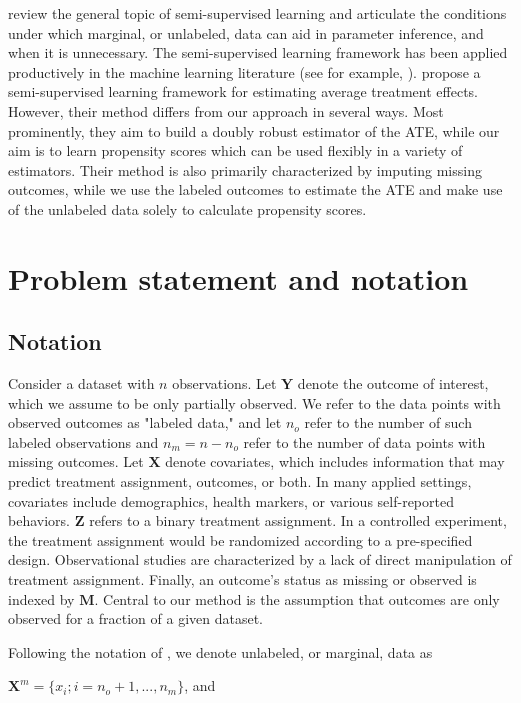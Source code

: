 \documentclass[aos]{imsart}
\newcommand{\X}{\mathbf{X}}
\newcommand{\M}{\mathbf{M}}
\newcommand{\Y}{\mathbf{Y}}
\newcommand{\Z}{\mathbf{Z}}
\begin{document}
\cite{liang2007use} review the general topic of semi-supervised learning and articulate the conditions 
under which marginal, or unlabeled, data can aid in parameter inference, and when it is unnecessary. 
The semi-supervised learning framework has been applied productively in the machine learning literature 
(see for example, \cite{kingma2014semi}).
\cite{cheng2018efficient} propose a semi-supervised learning framework for estimating average treatment effects. 
However, their method differs from our approach in several ways. 
Most prominently, they aim to build a doubly robust estimator of the ATE, while our aim is to 
learn propensity scores which can be used flexibly in a variety of estimators. Their method is also primarily characterized by 
imputing missing outcomes, while we use the labeled outcomes to estimate the ATE and make use of the unlabeled 
data solely to calculate propensity scores.

\section{Problem statement and notation}

\subsection{Notation}

Consider a dataset with $n$ observations. Let $\Y$ denote the outcome of interest, which we assume to be only partially observed. 
We refer to the data points with observed outcomes as "labeled data," and let $n_o$ refer to the number of such labeled observations 
and $n_m = n - n_o$ refer to the number of data points with missing outcomes.
Let $\X$ denote covariates, which includes information that may predict treatment assignment, outcomes, or both. 
In many applied settings, covariates include demographics, health markers, or various self-reported behaviors.
$\Z$ refers to a binary treatment assignment. In a controlled experiment, the treatment assignment would be randomized according to a pre-specified design. 
Observational studies are characterized by a lack of direct manipulation of treatment assignment. 
Finally, an outcome's status as missing or observed is indexed by $\M$. Central to our method is the assumption that outcomes are only 
observed for a fraction of a given dataset.

Following the notation of \cite{liang2007use}, we denote unlabeled, or marginal, data as

$\X^m = \{x_i; i = n_o + 1, ... , n_m \}$, and 
\end{document}
